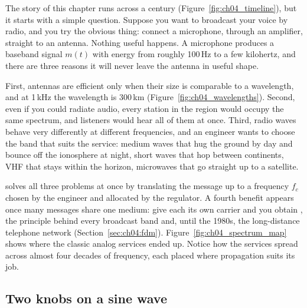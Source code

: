 The story of this chapter runs across a century (Figure~\ref{fig:ch04_timeline}), but it starts with a
simple question. Suppose you want to broadcast your voice by radio, and you try the obvious thing: connect a microphone,
through an amplifier, straight to an antenna. Nothing useful happens. A microphone produces a
baseband signal $m(t)$ with energy from roughly 100\,Hz to a few kilohertz, and there are three reasons
it will never leave the antenna in useful shape.


First, antennas are efficient only when their size is comparable to a wavelength, and at 1\,kHz the
wavelength is 300\,km (Figure~\ref{fig:ch04_wavelengths}). Second, even if you could radiate audio,
every station in the region would occupy the same spectrum, and listeners would hear all of them at
once. Third, radio waves behave very differently at different frequencies, and an engineer wants to
choose the band that suits the service: medium waves that hug the ground by day and bounce off the
ionosphere at night, short waves that hop between continents, VHF that stays within the horizon,
microwaves that go straight up to a satellite.

 solves all three problems at once by translating the message up to a 
frequency $f_c$ chosen by the engineer and allocated by the regulator. A fourth benefit appears once
many messages share one medium: give each its own carrier and you obtain
, the principle behind every broadcast band and, until the 1980s,
the long-distance telephone network (Section~\ref{sec:ch04:fdm}). Figure~\ref{fig:ch04_spectrum_map}
shows where the classic analog services ended up. Notice how the services spread across almost four
decades of frequency, each placed where propagation suits its job.


\subsection*{Two knobs on a sine wave}

